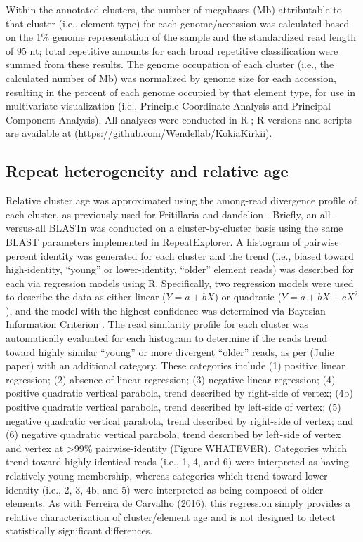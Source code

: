 \documentclass[10pt,letterpaper]{article}
\begin{document}
Within the annotated clusters, the number of megabases (Mb) attributable to that
cluster (i.e., element type) for each genome/accession was calculated based on
the 1\% genome representation of the sample and the standardized read length of
95 nt; total repetitive amounts for each broad repetitive classification were
summed from these results. The genome occupation of each cluster (i.e., the
calculated number of Mb) was normalized by genome size for each accession,
resulting in the percent of each genome occupied by that element type, for use
in multivariate visualization (i.e., Principle Coordinate Analysis and Principal
Component Analysis). All analyses were conducted in R \cite{R2017}; R versions
and scripts are available at (https://github.com/Wendellab/KokiaKirkii).

\subsection*{Repeat heterogeneity and relative age}
Relative cluster age was approximated using the among-read divergence profile of
each cluster, as previously used for Fritillaria \cite{Kelly2015} and dandelion
\cite{Ferreira2016}. Briefly, an all-versus-all BLASTn \cite{Boratyn2013}
\cite{Altshul1990} was conducted on a cluster-by-cluster basis using the same
BLAST parameters implemented in RepeatExplorer. A histogram of pairwise percent
identity was generated for each cluster and the trend (i.e., biased toward
high-identity, “young” or lower-identity, “older” element reads) was described
for each via regression models using R. Specifically, two regression models were
used to describe the data as either linear ($Y = a + bX$) or quadratic
($Y = a + bX + cX^2$), and the model with the highest confidence was determined
via Bayesian Information Criterion \cite{Schwarz1978}. The read similarity
profile for each cluster was automatically evaluated for each histogram to
determine if the reads trend toward highly similar “young” or more divergent
“older” reads, as per (Julie paper) with an additional category. These
categories include (1) positive linear regression; (2) absence of linear
regression; (3) negative linear regression; (4) positive quadratic vertical
parabola, trend described by right-side of vertex; (4b) positive quadratic
vertical parabola, trend described by left-side of vertex; (5) negative
quadratic vertical parabola, trend described by right-side of vertex; and (6)
negative quadratic vertical parabola, trend described by left-side of vertex and
vertex at >99\% pairwise-identity (Figure WHATEVER). Categories which trend
toward highly identical reads (i.e., 1, 4, and 6) were interpreted as having
relatively young membership, whereas categories which trend toward lower
identity (i.e., 2, 3, 4b, and 5) were interpreted as being composed of older
elements. As with Ferreira de Carvalho (2016), this regression simply provides a
relative characterization of cluster/element age and is not designed to detect
statistically significant differences.
\end{document}
